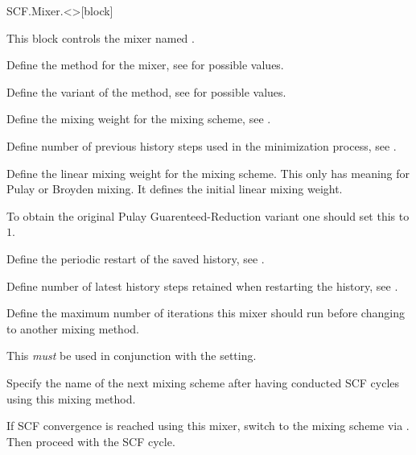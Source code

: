 \begin{fdfentry}{SCF.Mixer.<>}[block]

  This block controls the mixer named \fdf*{<>}. 

  \begin{fdfoptions}

    \option[method]%
    Define the method for the mixer, see  for
    possible values.

    \option[variant]%
    Define the variant of the method, see  for
    possible values.

    \option[weight|w]%
    Define the mixing weight for the mixing scheme, see
    .

    \option[history]%
    Define number of previous history steps used in the minimization process, see
    .

    Define the linear mixing weight for the mixing scheme. This only
    has meaning for Pulay or Broyden mixing. It defines the initial
    linear mixing weight. 

    To obtain the original Pulay Guarenteed-Reduction variant one
    should set this to $1$.

    \option[restart]%
    Define the periodic restart of the saved history, see
    .

    Define number of latest history steps retained when restarting the
    history, see .

    \option[iterations]%
    Define the maximum number of iterations this mixer should run
    before changing to another mixing method.

    \note This \emph{must} be used in conjunction with the  setting.

    Specify the name of the next mixing scheme after having conducted
     SCF cycles using this mixing method.

    If SCF convergence is reached using this mixer, switch to the
    mixing scheme via \fdf*{<>}. Then proceed with the SCF cycle.


\end{fdfoptions}
\end{fdfentry}
